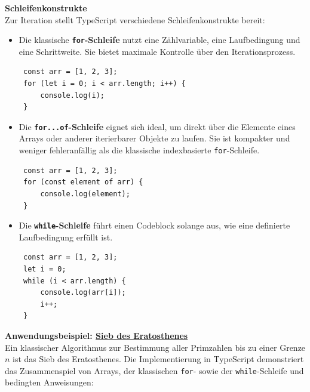\textbf{Schleifenkonstrukte}\\
Zur Iteration stellt TypeScript verschiedene Schleifenkonstrukte bereit:
\begin{itemize}
	\item Die klassische \textbf{\texttt{for}-Schleife} nutzt eine Zählvariable, eine Laufbedingung und eine Schrittweite. Sie bietet maximale Kontrolle über den Iterationsprozess.
\begin{verbatim}
 const arr = [1, 2, 3];
 for (let i = 0; i < arr.length; i++) {
     console.log(i);
 }
\end{verbatim}
	\item Die \textbf{\texttt{for...of}-Schleife} eignet sich ideal, um direkt über die Elemente eines Arrays oder anderer iterierbarer Objekte zu laufen. Sie ist kompakter und weniger fehleranfällig als die klassische indexbasierte \texttt{for}-Schleife.
\begin{verbatim}
 const arr = [1, 2, 3];
 for (const element of arr) {
     console.log(element);
 }
\end{verbatim}
	\item Die \textbf{\texttt{while}-Schleife} führt einen Codeblock solange aus, wie eine definierte Laufbedingung erfüllt ist.
\begin{verbatim}
 const arr = [1, 2, 3];
 let i = 0;
 while (i < arr.length) {
     console.log(arr[i]);
     i++;
 }
\end{verbatim}
\end{itemize}

\textbf{Anwendungsbeispiel: \href{https://en.wikipedia.org/wiki/Sieve_of_Eratosthenes}{Sieb des Eratosthenes}}\\
Ein klassischer Algorithmus zur Bestimmung aller Primzahlen bis zu einer Grenze $n$ ist das Sieb des Eratosthenes. Die Implementierung in TypeScript demonstriert das Zusammenspiel von Arrays, der klassischen \texttt{for}- sowie der \texttt{while}-Schleife und bedingten Anweisungen:

